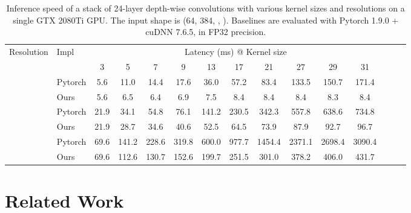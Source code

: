 \documentclass[10pt,twocolumn,letterpaper]{article}
\begin{document}
	
	\begin{table*}[t]
	\caption{Inference speed of a stack of 24-layer depth-wise convolutions with various kernel sizes and resolutions on a single GTX 2080Ti GPU. The input shape is (64, 384, , ). Baselines are evaluated with Pytorch 1.9.0 + cuDNN 7.6.5, in FP32 precision.}
	\label{table-speed-kernelsize}
	\small
	\begin{center}
	\vspace{-0.2in}
    \begin{tabular}{llccccccccccccc}
    \hline
    \multirow{2}{*}{Resolution } & \multirow{2}{*}{Impl} & \multicolumn{10}{c}{Latency (ms) @ Kernel size} \\
                                &                           
                                & 3     & 5     & 7     & 9     & 13   & 17     & 21    & 27    & 29    & 31        \\ \hline
    \multirow{2}{*}{}         & Pytorch        
                                & 5.6   & 11.0  & 14.4  & 17.6  & 36.0 & 57.2   & 83.4  & 133.5 & 150.7 & 171.4       \\
                                & Ours                      
                                & 5.6   & 6.5   & 6.4   & 6.9   & 7.5  & 8.4    & 8.4   & 8.4   & 8.3   & 8.4       \\ \hline
    \multirow{2}{*}{}         & Pytorch        
                                & 21.9  & 34.1  & 54.8  & 76.1  & 141.2 & 230.5 & 342.3 & 557.8 & 638.6 & 734.8       \\
                                & Ours                      
                                & 21.9  & 28.7  & 34.6  & 40.6  & 52.5  & 64.5  & 73.9  & 87.9  & 92.7  & 96.7       \\ \hline
    \multirow{2}{*}{}         & Pytorch                   
                                & 69.6  & 141.2 & 228.6 & 319.8 & 600.0 & 977.7 & 1454.4 & 2371.1 & 2698.4 & 3090.4      \\
                                & Ours  
                                & 69.6  & 112.6 & 130.7 & 152.6 & 199.7 & 251.5 & 301.0 & 378.2 & 406.0 & 431.7       \\ \hline
    \end{tabular}
    \end{center}
    \vspace{-0.3in}
    \end{table*}
	
	
	\section{Related Work}
	
\end{document}
